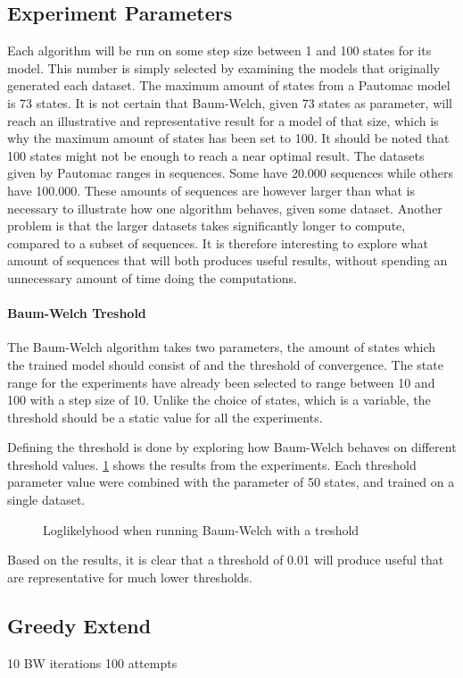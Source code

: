\subsection{Experiment Parameters}
Each algorithm will be run on some step size between 1 and 100 states for its model. This number is simply selected by examining the models that originally generated each dataset. The maximum amount of states from a Pautomac model is 73 states. It is not certain that Baum-Welch, given 73 states as parameter, will reach an illustrative and representative result for a model of that size, which is why the maximum amount of states has been set to 100. It should be noted that 100 states might not be enough to reach a near optimal result.
The datasets given by Pautomac ranges in sequences. Some have 20.000 sequences while others have 100.000. These amounts of sequences are however larger than what is necessary to illustrate how one algorithm behaves, given some dataset. Another problem is that the larger datasets takes significantly longer to compute, compared to a subset of sequences. It is therefore interesting to explore what amount of sequences that will both produces useful results, without spending an unnecessary amount of time doing the computations.


\paragraph{Baum-Welch Treshold}
The Baum-Welch algorithm takes two parameters, the amount of states which the trained model should consist of and the threshold of convergence. The state range for the experiments have already been selected to range between 10 and 100 with a step size of 10. Unlike the choice of states, which is a variable, the threshold should be a static value for all the experiments.

Defining the threshold is done by exploring how Baum-Welch behaves on different threshold values. \ref{fig:threshold} shows the results from the experiments. Each threshold parameter value were combined with the parameter of 50 states, and trained on a single dataset.

\begin{figure}
\centering
\caption{Loglikelyhood when running Baum-Welch with a treshold}
\label{fig:threshold}
\end{figure}

Based on the results, it is clear that a threshold of 0.01 will produce useful that are representative for much lower thresholds.

\subsection{Greedy Extend}
10 BW iterations
100 attempts